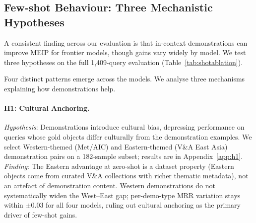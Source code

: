 \documentclass[11pt]{article}
\begin{document}
\subsection{Few-shot Behaviour: Three Mechanistic Hypotheses}
\label{sec:fewshot}

A consistent finding across our evaluation is that in-context
demonstrations can improve MEIP for frontier models, though gains
vary widely by model.
We test three hypotheses on the full 1{,}409-query evaluation
(Table~\ref{tab:shotablation}).

\begin{table}[!t]
\centering\small
\setlength{\tabcolsep}{4pt}
\caption{MEIP MRR across shot counts on 1{,}409-query evaluation (bold = best per model). $^\ddagger$: 500-query subset only.}
\label{tab:shotablation}
\end{table}

Four distinct patterns emerge across the models.
We analyse three mechanisms explaining how demonstrations help.


\paragraph{H1: Cultural Anchoring.}
\label{h1}
\emph{Hypothesis}: Demonstrations introduce cultural bias,
depressing performance on queries whose gold objects differ culturally
from the demonstration examples.
We select Western-themed (Met/AIC) and Eastern-themed (V\&A East Asia)
demonstration pairs on a 182-sample subset; results are in Appendix~\ref{app:h1}.
\emph{Finding}: The Eastern advantage at zero-shot is a dataset property
(Eastern objects come from curated V\&A collections with richer thematic
metadata), not an artefact of demonstration content.
Western demonstrations do not systematically widen the West--East gap;
per-demo-type MRR variation stays within $\pm$0.03 for all four models,
ruling out cultural anchoring as the primary driver of few-shot gains.
\end{document}
